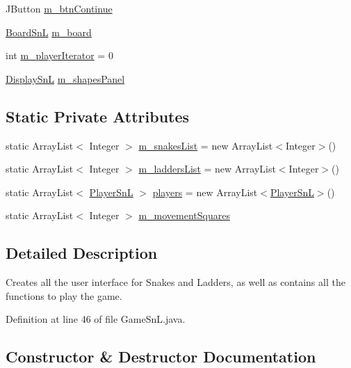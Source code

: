 \begin{DoxyCompactItemize}
\item 
J\+Button \hyperlink{class_game_1_1_game_sn_l_a6e2e15971627fbc196ed207742a79e44}{m\+\_\+btn\+Continue}
\item 
\hyperlink{class_board_1_1_board_sn_l}{Board\+Sn\+L} \hyperlink{class_game_1_1_game_sn_l_a9cb06e53592cfc48ca485c25ab9c1e42}{m\+\_\+board}
\item 
int \hyperlink{class_game_1_1_game_sn_l_a4cff3283ef1f344a871b2019ae92dd57}{m\+\_\+player\+Iterator} = 0
\item 
\hyperlink{class_display_1_1_display_sn_l}{Display\+Sn\+L} \hyperlink{class_game_1_1_game_sn_l_af35fcedb0f8206713981e01068c3f281}{m\+\_\+shapes\+Panel}
\end{DoxyCompactItemize}
\subsection*{Static Private Attributes}
\begin{DoxyCompactItemize}
\item 
static Array\+List$<$ Integer $>$ \hyperlink{class_game_1_1_game_sn_l_a904b75e06e59aa1a9c028a948f98e33e}{m\+\_\+snakes\+List} = new Array\+List$<$Integer$>$()
\item 
static Array\+List$<$ Integer $>$ \hyperlink{class_game_1_1_game_sn_l_a0b47e32e0960ed988d341b31b5f3bd3b}{m\+\_\+ladders\+List} = new Array\+List$<$Integer$>$()
\item 
static Array\+List$<$ \hyperlink{class_player_1_1_player_sn_l}{Player\+Sn\+L} $>$ \hyperlink{class_game_1_1_game_sn_l_a942dda31e02524f87962efa42b2c2642}{players} = new Array\+List$<$\hyperlink{class_player_1_1_player_sn_l}{Player\+Sn\+L}$>$()
\item 
static Array\+List$<$ Integer $>$ \hyperlink{class_game_1_1_game_sn_l_af8c7ff07d44c8713db098772d7888478}{m\+\_\+movement\+Squares}
\end{DoxyCompactItemize}


\subsection{Detailed Description}
Creates all the user interface for Snakes and Ladders, as well as contains all the functions to play the game. 

Definition at line 46 of file Game\+Sn\+L.\+java.



\subsection{Constructor \& Destructor Documentation}
\hypertarget{class_game_1_1_game_sn_l_a76663e6331e7f09bdb0baaf6d3f28b2f}{}
